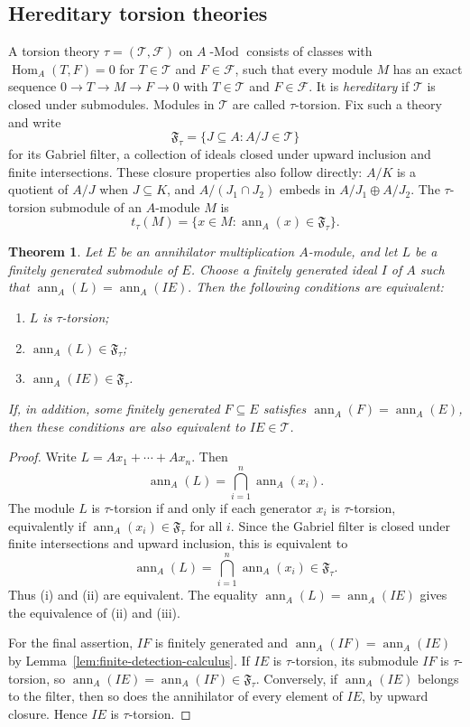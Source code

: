 \documentclass[11pt]{amsart}
\theoremstyle{plain}
\newtheorem{theorem}{Theorem}[section]
\theoremstyle{definition}
\theoremstyle{remark}
\DeclareMathOperator{\Hom}{Hom}
\newcommand{\ann}{\operatorname{ann}}
\numberwithin{equation}{section}
\begin{document}
\subsection{Hereditary torsion theories}

A torsion theory $\tau=(\mathcal T,\mathcal F)$ on
$A\operatorname{-Mod}$ consists of classes with
$\Hom_A(T,F)=0$ for $T\in\mathcal T$ and $F\in\mathcal F$, such that every
module $M$ has an exact sequence $0\to T\to M\to F\to0$ with
$T\in\mathcal T$ and $F\in\mathcal F$.
It is \emph{hereditary} if $\mathcal T$ is closed under submodules.
Modules in $\mathcal T$ are called $\tau$-torsion. Fix such a theory and write
\[
\mathfrak F_\tau=\{J\subseteq A:A/J\in\mathcal T\}
\]
for its Gabriel filter, a collection of ideals closed under upward inclusion
and finite intersections. These closure properties also follow directly:
$A/K$ is a quotient of $A/J$ when $J\subseteq K$, and
$A/(J_1\cap J_2)$ embeds in $A/J_1\oplus A/J_2$.
The $\tau$-torsion submodule of an $A$-module $M$ is
\[
t_\tau(M)=\{x\in M:\ann_A(x)\in\mathfrak F_\tau\}.
\]

\begin{theorem}
\label{thm:torsion-test}
Let $E$ be an annihilator multiplication $A$-module, and let $L$ be a finitely
generated submodule of $E$. Choose a finitely generated ideal $I$ of $A$ such
that $\ann_A(L)=\ann_A(IE).$
Then the following conditions are equivalent:
\begin{enumerate}[label=\textup{(\roman*)}]
  \item $L$ is $\tau$-torsion;
  \item $\ann_A(L)\in\mathfrak F_\tau$;
  \item $\ann_A(IE)\in\mathfrak F_\tau$.
\end{enumerate}
If, in addition, some finitely generated $F\subseteq E$ satisfies
$\ann_A(F)=\ann_A(E)$, then these conditions are also equivalent to
$IE\in\mathcal T$.
\end{theorem}

\begin{proof}
Write $L=Ax_1+\cdots+Ax_n$. Then
\[
\ann_A(L)=\bigcap_{i=1}^n\ann_A(x_i).
\]
The module $L$ is $\tau$-torsion if and only if each generator $x_i$ is
$\tau$-torsion, equivalently if $\ann_A(x_i)\in\mathfrak F_\tau$ for all $i$.
Since the Gabriel filter is closed under finite intersections and upward
inclusion, this is equivalent to
\[
\ann_A(L)=\bigcap_{i=1}^n\ann_A(x_i)\in\mathfrak F_\tau.
\]
Thus (i) and (ii) are equivalent. The equality
$\ann_A(L)=\ann_A(IE)$ gives the equivalence of (ii) and (iii).

For the final assertion, $IF$ is finitely generated and
$\ann_A(IF)=\ann_A(IE)$ by Lemma~\ref{lem:finite-detection-calculus}.
If $IE$ is $\tau$-torsion, its submodule $IF$ is $\tau$-torsion,
so $\ann_A(IE)=\ann_A(IF)\in\mathfrak F_\tau$.
Conversely, if $\ann_A(IE)$ belongs to the filter, then so does the
annihilator of every element of $IE$, by upward closure.
Hence $IE$ is $\tau$-torsion.
\end{proof}
\end{document}
